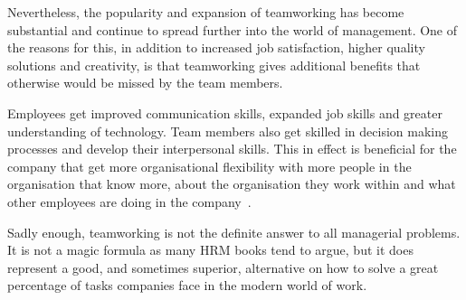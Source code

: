 \documentclass[a4paper,12pt,titlepage]{article}
\begin{document}
  Nevertheless, the popularity and
  expansion of teamworking has become substantial and continue
  to spread further into the world of management. One of the
  reasons for this, in addition to increased job satisfaction,
  higher quality solutions and creativity, is that teamworking
  gives additional benefits that otherwise would be missed by
  the team members.

  Employees get improved communication skills,
  expanded job skills and greater understanding of technology. Team
  members also get skilled in decision making processes and
  develop their interpersonal skills. This in effect is
  beneficial for the company that get more organisational flexibility
  with more people in the organisation that know more, about
  the organisation they work within and what other employees are doing
  in the company~\cite[303]{sr}.

  Sadly enough, teamworking is not the definite answer to all
  managerial problems. It is not a magic formula as many HRM books
  tend to argue, but it does represent a good, and sometimes
  superior, alternative on how to solve a great percentage
  of tasks companies face in the modern world of work.

  \newpage
  \setlength{\baselineskip}{1.3em}
  
  
  \nocite{*}
\end{document}
